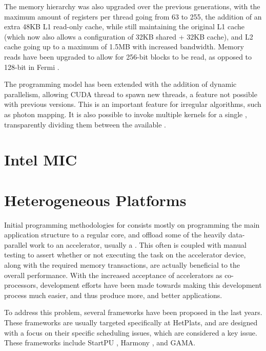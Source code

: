 \documentclass[main.tex]{subfiles}
\begin{document}

The memory hierarchy was also upgraded over the previous generations, with the maximum amount of registers per thread going from 63 to 255, the addition of an extra 48KB L1 read-only cache, while still maintaining the original L1 cache (which now also allows a configuration of 32KB shared + 32KB cache), and L2 cache going up to a maximum of 1.5MB with increased bandwidth. Memory reads have been upgraded to allow for 256-bit blocks to be read, as opposed to 128-bit in Fermi \cite{NVIDIA:kepler}.

The programming model has been extended with the addition of dynamic parallelism, allowing \acs{CUDA} thread to spawn new threads, a feature not possible with previous versions. This is an important feature for irregular algorithms, such as photon mapping. It is also possible to invoke multiple kernels for a single \gpu, transparently dividing them between the available \smxs.


\section{Intel MIC}


\section{Heterogeneous Platforms}


Initial programming methodologies for \hetplats consists mostly on programming the main application structure to a regular \cpu core, and offload some of the heavily data-parallel work to an accelerator, usually a \gpu. This often is coupled with manual testing to assert whether or not executing the task on the accelerator device, along with the required memory transactions, are actually beneficial to the overall performance.
With the increased acceptance of accelerators as co-processors, development efforts have been made towards making this development process much easier, and thus produce more, and better applications.

To address this problem, several frameworks have been proposed in the last years. These frameworks are usually targeted specifically at \acp{HetPlat}, and are designed with a focus on their specific scheduling issues, which are considered a key issue. These frameworks include StartPU \cite{augonnet2011starpu}, Harmony \cite{diamos2008harmony}, and GAMA. 
\end{document}
